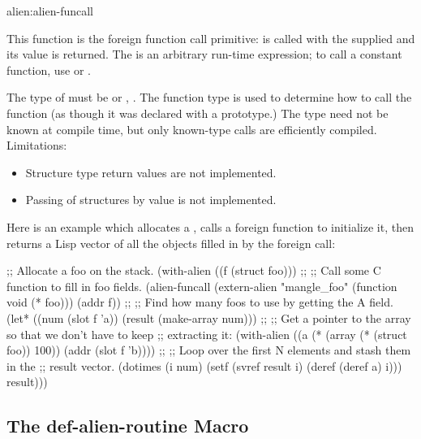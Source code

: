 \begin{defun}{alien:}{alien-funcall}{%
    }
  
  This function is the foreign function call primitive:
   is called with the supplied  and
  its value is returned.  The  is an arbitrary
  run-time expression; to call a constant function, use
   or .
  
  The type of  must be  or ,
  .  The function type is used to
  determine how to call the function (as though it was declared with
  a prototype.)  The type need not be known at compile time, but only
  known-type calls are efficiently compiled.  Limitations:
  \begin{itemize}
  \item Structure type return values are not implemented.
  \item Passing of structures by value is not implemented.
  \end{itemize}
\end{defun}

Here is an example which allocates a , calls a foreign
function to initialize it, then returns a Lisp vector of all the
 objects filled in by the foreign call:

\begin{lisp}
;; Allocate a foo on the stack.
(with-alien ((f (struct foo)))
  ;;
  ;; Call some C function to fill in foo fields.
  (alien-funcall (extern-alien "mangle_foo" (function void (* foo)))
                 (addr f))
  ;;
  ;; Find how many foos to use by getting the A field.
  (let* ((num (slot f 'a))
         (result (make-array num)))
    ;;
    ;; Get a pointer to the array so that we don't have to keep
    ;; extracting it:
    (with-alien ((a (* (array (* (struct foo)) 100)) (addr (slot f 'b))))
      ;;
      ;; Loop over the first N elements and stash them in the
      ;; result vector.
      (dotimes (i num)
        (setf (svref result i) (deref (deref a) i)))
      result)))
\end{lisp}


\subsection{The def-alien-routine Macro}

